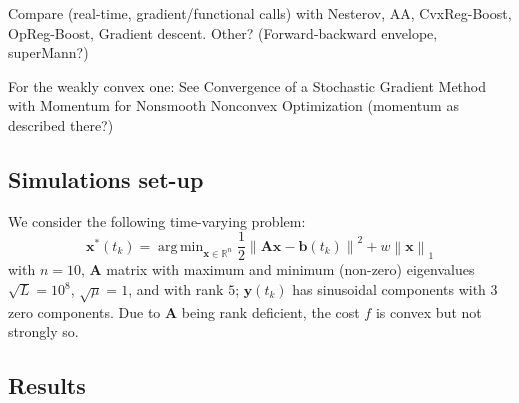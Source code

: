 \documentclass{article}
\DeclareMathOperator*{\argmin}{arg\,min}
\newcommand{\norm}[1]{\left\lVert#1\right\rVert}
\newcommand{\R}{\mathbb{R}}
\newcommand{\bv}{\mathbold{b}}
\newcommand{\x}{\mathbold{x}}
\newcommand{\y}{\mathbold{y}}
\newcommand{\Am}{\mathbold{A}}
\begin{document}
Compare (real-time, gradient/functional calls) with Nesterov, AA, CvxReg-Boost, OpReg-Boost, Gradient descent. Other? (Forward-backward envelope, superMann?)

For the weakly convex one: See Convergence of a Stochastic Gradient Method with Momentum for Nonsmooth Nonconvex Optimization (momentum as described there?)



\subsection{Simulations set-up}
We consider the following time-varying problem:
\begin{equation}\label{eq:tv-problem}
	\x^*(t_k) = \argmin_{\x \in \R^n} \frac{1}{2} \norm{\Am \x - \bv(t_k)}^2 + w \norm{\x}_1
\end{equation}
with $n = 10$, $\Am$ matrix with maximum and minimum (non-zero) eigenvalues $\sqrt{L} = 10^8$, $\sqrt{\mu} = 1$, and with rank $5$; $\y(t_k)$ has sinusoidal components with $3$ zero components. Due to $\Am$ being rank deficient, the cost $f$ is convex but not strongly so.


\subsection{Results}






\end{document}
